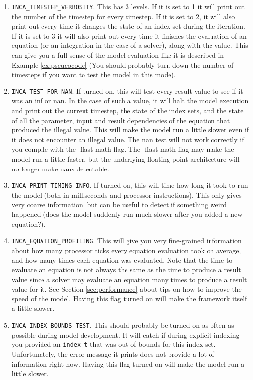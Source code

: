 \documentclass[11pt]{article}
\theoremstyle{definition}
\begin{document}
\begin{enumerate}[i]
\item {\tt INCA\_TIMESTEP\_VERBOSITY}. This has 3 levels. If it is set to 1 it will print out the number of the timestep for every timestep. If it is set to 2, it will also print out every time it changes the state of an index set during the iteration. If it is set to 3 it will also print out every time it finishes the evaluation of an equation (or an integration in the case of a solver), along with the value. This can give you a full sense of the model evaluation like it is described in Example \ref{ex:pseucocode} (You should probably turn down the number of timesteps if you want to test the model in this mode).
\item {\tt INCA\_TEST\_FOR\_NAN}. If turned on, this will test every result value to see if it was an inf or nan. In the case of such a value, it will halt the model execution and print out the current timestep, the state of the index sets, and the state of all the parameter, input and result dependencies of the equation that produced the illegal value. This will make the model run a little slower even if it does not encounter an illegal value. The nan test will not work correctly if you compile with the -ffast-math flag. The -ffast-math flag may make the model run a little faster, but the underlying floating point architecture will no longer make nans detectable.
\item {\tt INCA\_PRINT\_TIMING\_INFO}. If turned on, this will time how long it took to run the model (both in milliseconds and processor instructions). This only gives very coarse information, but can be useful to detect if something weird happened (does the model suddenly run much slower after you added a new equation?).
\item {\tt INCA\_EQUATION\_PROFILING}. This will give you very fine-grained information about how many processor ticks every equation evaluation took on average, and how many times each equation was evaluated. Note that the time to evaluate an equation is not always the same as the time to produce a result value since a solver may evaluate an equation many times to produce a result value for it. See Section \ref{sec:performance} about tips on how to improve the speed of the model. Having this flag turned on will make the framework itself a little slower.
\item {\tt INCA\_INDEX\_BOUNDS\_TEST}. This should probably be turned on as often as possible during model development. It will catch if during explicit indexing you provided an {\tt index\_t} that was out of bounds for this index set. Unfortunately, the error message it prints does not provide a lot of information right now. Having this flag turned on will make the model run a little slower.
\end{enumerate}
\end{document}
